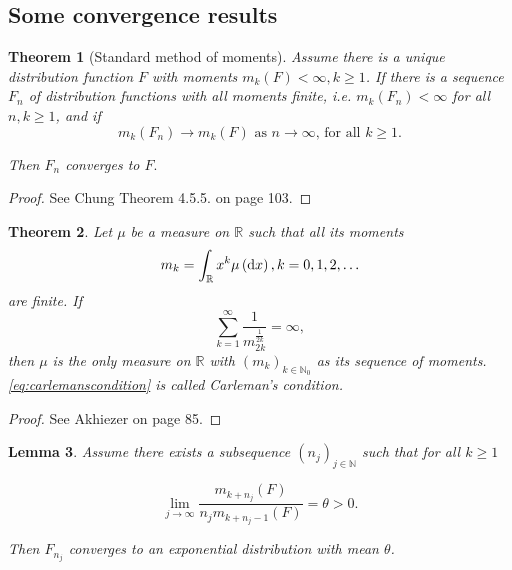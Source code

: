 \documentclass[12pt,a4paper]{scrartcl}
\newtheorem{theorem}{Theorem}[section]
\newtheorem{lemma}[theorem]{Lemma}
\numberwithin{equation}{section}
\newcommand{\R}{\mathbb{R}} %
\newcommand{\N}{\mathbb{N}} %
\begin{document}
\subsection{Some convergence results}
\begin{theorem} [Standard method of moments]
Assume there is a unique distribution function $F$ with  moments $m_k\left(F\right) < \infty, k \geq 1$. If there is a sequence $F_n$ of distribution functions with all moments finite, i.e. $m_k\left(F_n\right) < \infty $ for all $ n,k \geq 1 $, and if
$$  m_k\left(F_n\right) \to m_k\left(F\right) \text{ as $n \to \infty$, for all $k\geq 1$} .$$

Then $F_n$ converges to $F.$
\end{theorem}
\begin{proof}
See Chung \cite{chung} Theorem 4.5.5. on page 103.
\end{proof}

\begin{theorem}
Let $\mu$ be a measure on $\R$ such that all its moments
$$ m_k = \int_{\R} x^k \mu\left(\textnormal{d}x\right),  k=0,1,2,\ldots $$
are finite. If 
\begin{equation} \label{eq:carlemanscondition}
\sum_{k=1}^{\infty} \frac{1}{m_{2k}^{\frac{1}{2k}}} = \infty,
\end{equation}
then $\mu$ is the only measure on $\R$ with $\left(m_k\right)_{k \in \N_0}$ as its sequence of moments. \eqref{eq:carlemanscondition} is called Carleman’s condition.
\end{theorem}
\begin{proof}
See Akhiezer \cite{akhiezer} on page 85.
\end{proof}


\begin{lemma}
\label{subsequencelemmaone}
Assume there exists a subsequence $\left(n_j\right)_{j \in \N}$ such that for all $ k \geq 1 $

$$ \lim_{j \to \infty} \frac{m_{k+n_j}\left(F\right)}{n_j m_{k+n_j-1}\left(F\right)} = \theta > 0. $$

Then $F_{n_j}$ converges to an exponential distribution with mean $ \theta $.

\end{lemma}
\end{document}
